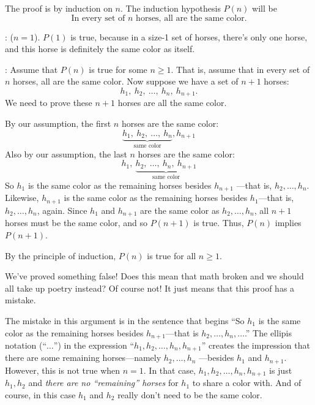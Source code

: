 \begin{bogusproof}

The proof is by induction on $n$.  The induction hypothesis $P(n)$
will be
\begin{equation}\label{horsehyp}
\text{In every set of $n$ horses, all are the same color.}
\end{equation}

: ($n=1$).  $P(1)$ is true, because in a
size-1 set of horses, there's only one horse, and this horse is
definitely the same color as itself.

: Assume that $P(n)$ is true for some $n \geq 1$.
That is, assume that in every set of $n$ horses, all are the same color.
Now suppose we have a set of $n+1$ horses:
\[
h_1,\ h_2,\ \dots,\ h_n,\ h_{n+1}.
\]
We need to prove these $n+1$ horses are all the same color.

By our assumption, the first $n$ horses are the same color:
\[
\underbrace{h_1,\ h_2,\ \dots,\ h_n}_{\text{same color}}, h_{n+1}
\]
Also by our assumption, the last $n$ horses are the same color:
\[
h_1,\ \underbrace{h_2,\ \dots,\ h_n,\ h_{n+1}}_{\text{same color}}
\]
So $h_1$ is the same color as the remaining horses besides $h_{n+1}$
---that is, $h_2, \dots, h_n$.  Likewise, $h_{n+1}$ is the same
color as the remaining horses besides $h_1$---that is, $h_2, \dots,
h_n$, again.  Since $h_1$ and $h_{n+1}$ are the same color as $h_2,
\dots, h_n$, all $n+1$ horses must be the same color, and so $P(n+1)$
is true.  Thus, $P(n)$ implies $P(n+1)$.

By the principle of induction, $P(n)$ is true for all $n \geq 1$.
\end{bogusproof}
We've proved something false!  Does this mean that math broken and we
should all take up poetry instead?  Of course not!  It just means
that this proof has a mistake.

\iffalse
\textbf{See if you can figure it out before we take it up in class.}
\fi

The mistake in this argument is in the sentence that begins ``So $h_1$
is the same color as the remaining horses besides $h_{n+1}$---that is
$h_2, \dots, h_n, \dots$.''  The ellipis notation (``$\dots$'') in the
expression ``$h_1, h_2, \dots, h_n, h_{n+1}$'' creates the impression
that there are some remaining horses---namely $h_2, \dots, h_n$
---besides $h_1$ and $h_{n+1}$.  However, this is not true when $n =
1$.  In that case, $h_1, h_2, \dots, h_n, h_{n+1}$ is just $h_1, h_2$
and \emph{there are no ``remaining'' horses} for $h_1$ to share a
color with.  And of course, in this case $h_1$ and $h_2$ really don't
need to be the same color.

